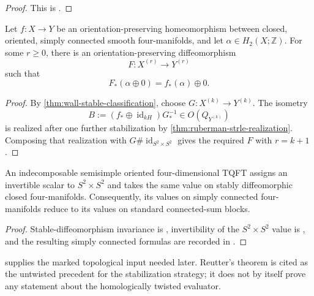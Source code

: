 \begin{proof}
This is \cite[Theorem~2.1]{RubermanStrle2022}.
\end{proof}

\begin{corollary}
\label{cor:marked-stable-realization}
Let $f\colon X\to Y$ be an orientation-preserving homeomorphism between
closed, oriented, simply connected smooth four-manifolds, and let
$\alpha\in H_2(X;\mathbb Z)$.  For some $r\geq 0$, there is an
orientation-preserving diffeomorphism
\[
  F\colon X^{(r)}\longrightarrow Y^{(r)}
\]
such that
\[
  F_*(\alpha\oplus0)=f_*(\alpha)\oplus0.
\]
\end{corollary}

\begin{proof}
By \cref{thm:wall-stable-classification}, choose
$G\colon X^{(k)}\to Y^{(k)}$.  The isometry
\[
  B:=(f_*\oplus\operatorname{id}_{kH})G_*^{-1}
  \in O(Q_{Y^{(k)}})
\]
is realized after one further stabilization by
\cref{thm:ruberman-strle-realization}.  Composing that realization with
$G\#\operatorname{id}_{S^2\times S^2}$ gives the required $F$ with
$r=k+1$.
\end{proof}

\begin{theorem}
\label{thm:reutter-stable-evaluation}
An indecomposable semisimple oriented four-dimensional TQFT assigns an
invertible scalar to $S^2\times S^2$ and takes the same value on stably
diffeomorphic closed four-manifolds.  Consequently, its values on simply
connected four-manifolds reduce to its values on standard connected-sum
blocks.
\end{theorem}

\begin{proof}
Stable-diffeomorphism invariance is \cite[Theorem~A]{Reutter2023},
invertibility of the $S^2\times S^2$ value is
\cite[Theorem~3.5]{Reutter2023}, and the resulting simply connected formulas
are recorded in \cite[Corollary~3.9]{Reutter2023}.
\end{proof}

\begin{remark}
\label{rem:twisted-stabilization-use}
 supplies the marked topological input
needed later.  Reutter's theorem is cited as the untwisted precedent for the
stabilization strategy; it does not by itself prove any statement about the
homologically twisted evaluator.
\end{remark}

